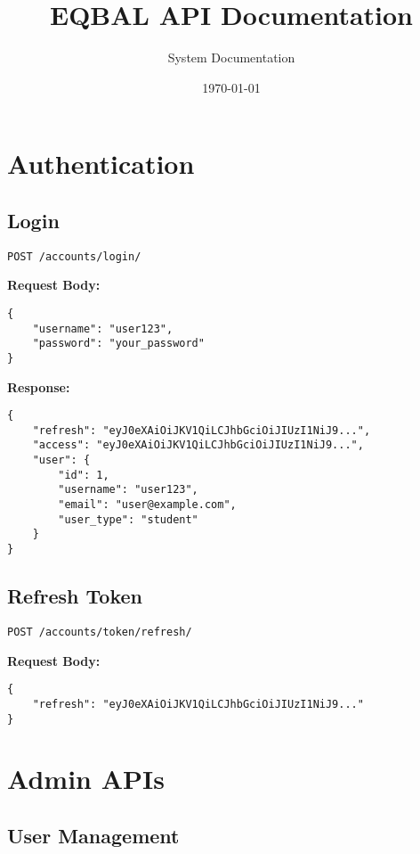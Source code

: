\documentclass[11pt,a4paper]{article}
\title{\Huge EQBAL API Documentation}
\author{System Documentation}
\date{\today}
\begin{document}
\maketitle
\tableofcontents
\newpage

\section{Authentication}

\subsection{Login}
\begin{lstlisting}[style=http]
POST /accounts/login/
\end{lstlisting}

\textbf{Request Body:}
\begin{lstlisting}[style=json]
{
    "username": "user123",
    "password": "your_password"
}
\end{lstlisting}

\textbf{Response:}
\begin{lstlisting}[style=json]
{
    "refresh": "eyJ0eXAiOiJKV1QiLCJhbGciOiJIUzI1NiJ9...",
    "access": "eyJ0eXAiOiJKV1QiLCJhbGciOiJIUzI1NiJ9...",
    "user": {
        "id": 1,
        "username": "user123",
        "email": "user@example.com",
        "user_type": "student"
    }
}
\end{lstlisting}

\subsection{Refresh Token}
\begin{lstlisting}[style=http]
POST /accounts/token/refresh/
\end{lstlisting}

\textbf{Request Body:}
\begin{lstlisting}[style=json]
{
    "refresh": "eyJ0eXAiOiJKV1QiLCJhbGciOiJIUzI1NiJ9..."
}
\end{lstlisting}

\section{Admin APIs}

\subsection{User Management}
\end{document}
